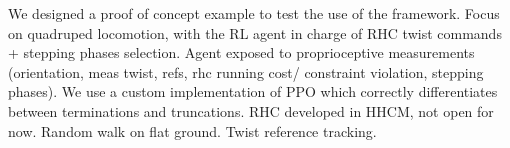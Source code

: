 {\Large We designed a proof of concept example to test the use of the framework. Focus on quadruped locomotion, with the RL agent in charge of RHC twist commands + stepping phases selection. Agent exposed to proprioceptive measurements (orientation, meas twist, refs, rhc running cost/ constraint violation, stepping phases). We use a custom implementation of PPO which correctly differentiates between terminations and truncations. RHC developed in HHCM, not open for now. Random walk on flat ground. Twist reference tracking.}
\vspace{10cm}